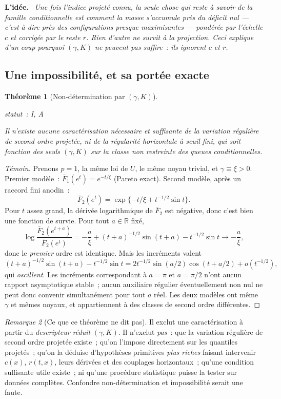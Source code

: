 \documentclass[11pt]{article}
\theoremstyle{plain}
\newtheorem{theoreme}{Théorème}[section]
\theoremstyle{definition}
\theoremstyle{remark}
\newtheorem{remarque}[theoreme]{Remarque}
\newcommand{\R}{\mathbb R}
\newcommand{\1}{\mathbf 1}
\newcommand{\statut}[1]{%
  \nopagebreak\par\nopagebreak
  \hfill{\normalfont\footnotesize\textcolor{gris}{statut~: #1}}%
  \par\nopagebreak\vspace{-2pt}}
\newenvironment{idee}
  {\par\medskip\noindent\textcolor{bleu}{\textbf{L'idée.}}\ \itshape}
  {\par\medskip}
\begin{document}
\begin{idee}
Une fois l'indice projeté connu, la seule chose qui reste à savoir de la
famille conditionnelle est \emph{comment la masse s'accumule près du
déficit nul} --- c'est-à-dire près des configurations presque
maximisantes --- pondérée par l'échelle $c$ et corrigée par le reste $r$.
Rien d'autre ne survit à la projection. Ceci explique d'un coup pourquoi
$(\gamma,K)$ ne peuvent pas suffire~: ils ignorent $c$ et $r$.
\end{idee}

\subsection{Une impossibilité, et sa portée exacte}

\begin{theoreme}[Non-détermination par $(\gamma,K)$]
\label{thm:nondet}
\statut{I, A}
Il n'existe aucune caractérisation nécessaire et suffisante de la
variation régulière de second ordre projetée, ni de la régularité
horizontale à seuil fini, qui soit fonction des seuls $(\gamma,K)$ sur la
classe non restreinte des queues conditionnelles.
\end{theoreme}

\begin{proof}[Témoin]
Prenons $p=1$, la même loi de $U$, le même noyau trivial, et
$\gamma\equiv\xi>0$. Premier modèle~: $\bar F_1(e^t)=e^{-t/\xi}$ (Pareto
exact). Second modèle, après un raccord fini anodin~:
\[
 \bar F_2(e^t)=\exp\{-t/\xi+t^{-1/2}\sin t\}.
\]
Pour $t$ assez grand, la dérivée logarithmique de $\bar F_2$ est
négative, donc c'est bien une fonction de survie. Pour tout $a\in\R$
fixé,
\[
 \log\frac{\bar F_2(e^{t+a})}{\bar F_2(e^{t})}
 =-\frac a\xi+(t+a)^{-1/2}\sin(t+a)-t^{-1/2}\sin t
 \longrightarrow-\frac a\xi,
\]
donc le \emph{premier} ordre est identique. Mais les incréments valent
\[
 (t+a)^{-1/2}\sin(t+a)-t^{-1/2}\sin t
 =2t^{-1/2}\sin(a/2)\cos(t+a/2)+o(t^{-1/2}),
\]
qui \emph{oscillent}. Les incréments correspondant à $a=\pi$ et
$a=\pi/2$ n'ont aucun rapport asymptotique stable~; aucun auxiliaire
régulier éventuellement non nul ne peut donc convenir simultanément pour
tout $a$ réel. Les deux modèles ont même $\gamma$ et mêmes noyaux, et
appartiennent à des classes de second ordre différentes.
\end{proof}

\begin{remarque}[Ce que ce théorème ne dit pas]
\label{rem:portee-nondet}
Il exclut une caractérisation à partir du \emph{descripteur réduit}
$(\gamma,K)$. Il n'exclut \emph{pas}~: que la variation régulière de
second ordre projetée existe~; qu'on l'impose directement sur les
quantiles projetés~; qu'on la déduise d'hypothèses primitives
\emph{plus riches} faisant intervenir $c(x)$, $r(t,x)$, leurs dérivées et
des couplages horizontaux~; qu'une condition suffisante utile existe~; ni
qu'une procédure statistique puisse la tester sur données complètes.
Confondre non-détermination et impossibilité serait une faute.
\end{remarque}
\end{document}
